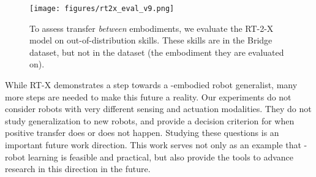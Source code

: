 \begin{figure}[t]
\vspace{0.2em}
    \centering
    \texttt{[image: figures/rt2x\_eval\_v9.png]}
    \vspace{-1.5em}
    \caption{\small To assess transfer \emph{between} embodiments, we evaluate the RT-2-X model on out-of-distribution skills. 
    These skills are in the Bridge dataset, but not in the \edrbot dataset (the embodiment they are evaluated on).
    }
\label{fig:emergent_skill}
\vspace{-2.3em}
\end{figure}

While RT-X demonstrates a step towards a \cro-embodied robot generalist, many more steps are needed to make this future a reality.
Our experiments do not consider robots with very different sensing and actuation modalities.
They do not study generalization to new robots, and provide a decision criterion for when positive transfer does or does not happen. 
Studying these questions is an important future work direction. 
This work serves not only as an example that \cro-robot learning is feasible and practical, but also provide the tools to advance research in this direction in the future.

